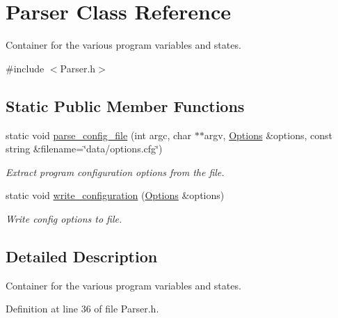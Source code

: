 \hypertarget{class_parser}{
\section{\-Parser \-Class \-Reference}
\label{class_parser}
}


\-Container for the various program variables and states.  




{\ttfamily \#include $<$\-Parser.\-h$>$}

\subsection*{\-Static \-Public \-Member \-Functions}
\begin{DoxyCompactItemize}
\item 
static void \hyperlink{class_parser_ac030c871d4f36e475391c0d2c0b204a5}{parse\-\_\-config\-\_\-file} (int argc, char $\ast$$\ast$argv, \hyperlink{class_options}{\-Options} \&options, const string \&filename=\char`\"{}data/options.\-cfg\char`\"{})
\begin{DoxyCompactList}\small\item\em \-Extract program configuration options from the file. \end{DoxyCompactList}\item 
static void \hyperlink{class_parser_ac37db3a8867432eab2abb457c68a62b6}{write\-\_\-configuration} (\hyperlink{class_options}{\-Options} \&options)
\begin{DoxyCompactList}\small\item\em \-Write config options to file. \end{DoxyCompactList}\end{DoxyCompactItemize}


\subsection{\-Detailed \-Description}
\-Container for the various program variables and states. 

\-Definition at line 36 of file \-Parser.\-h.




